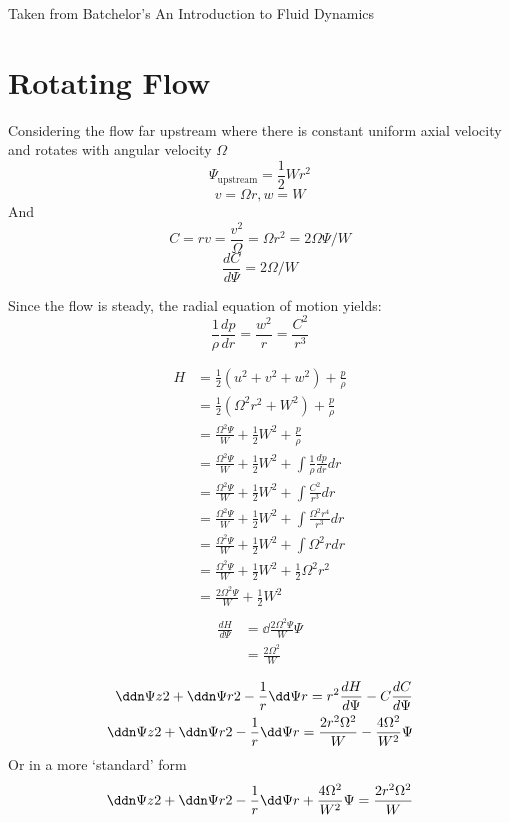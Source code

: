 \documentclass{X:/Documents/Coding/Latex/myreport}
\begin{document}
Taken from Batchelor's An Introduction to Fluid Dynamics

\section{Rotating Flow}
Considering the flow far upstream where there is constant uniform axial velocity and rotates with angular velocity $\Omega$ 
\[\Psi_{\text{upstream}} = \frac12 W r^2\]
\[v = \Omega r, w =W\]
And
\[C = rv =  \frac{v^2}{\Omega} = \Omega r^2 = 2\Omega \Psi/W \]
\[\frac{dC}{d\Psi} = 2\Omega/W\]

Since the flow is steady, the radial equation of motion yields:
\[\frac1\rho \frac{dp}{dr} = \frac{w^2}{r} = \frac{C^2}{r^3}\]

\begin{align*}
H &= \frac12 (u^2 + v^2 + w^2) + \frac p\rho\\
&=\frac12 (\Omega^2r^2 + W^2) + \frac p\rho   \\
&=\frac{\Omega^2 \Psi}{W} + \frac12 W^2 + \frac p\rho\\
&=\frac{\Omega^2 \Psi}{W} + \frac12 W^2 +  \int \frac1\rho\frac{dp}{dr} dr\\
&=\frac{\Omega^2 \Psi}{W} + \frac12 W^2 +  \int \frac{C^2}{r^3} dr\\
&=\frac{\Omega^2 \Psi}{W} + \frac12 W^2 +  \int \frac{\Omega^2 r^4}{r^3} dr\\
&=\frac{\Omega^2 \Psi}{W} + \frac12 W^2 +  \int \Omega^2 r dr\\
&=\frac{\Omega^2 \Psi}{W} + \frac12 W^2 +  \frac12 \Omega^2 r^2 \\
&=\frac{2\Omega^2 \Psi}{W} + \frac12 W^2 \\
\end{align*}
\begin{align*}
\frac{dH}{d\Psi} &=\dd{\frac{2\Omega^2 \Psi}{W}}{\Psi}\\
&=  \frac{2\Omega^2}{W}    
\end{align*}


\begin{align*}
    \ddn \Psi z 2 + \ddn \Psi r2 - \frac1r \dd\Psi r= r^2 \frac{dH}{d\Psi} - C\frac{dC}{d\Psi}\\
    \ddn \Psi z 2 + \ddn \Psi r2 - \frac1r \dd\Psi r= \frac{2 r^2 \Omega^2}{W} - \frac{4\Omega^2}{W^2}\Psi\\
\end{align*}
Or in a more `standard' form
\[\ddn \Psi z 2 + \ddn \Psi r2 - \frac1r \dd\Psi r + \frac{4\Omega^2}{W^2}\Psi= \frac{2 r^2 \Omega^2}{W} \]
\end{document}
